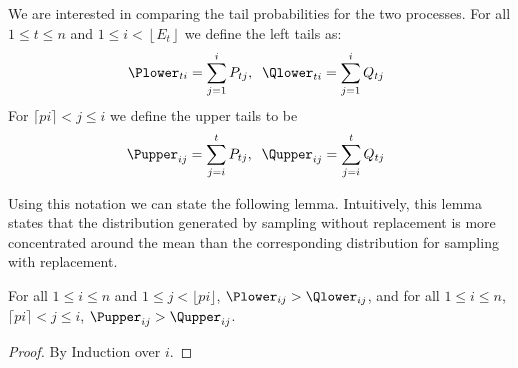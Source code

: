 We are interested in comparing the tail probabilities for the two
processes. For all $1 \leq t \leq n$ and $1 \leq i < \left\lfloor
E_t\right\rfloor $ we define the left tails as:
\[
\Plower_{ti} = \sum_{j=1}^i P_{tj},\;\;
\Qlower_{ti} = \sum_{j=1}^i Q_{tj}\;\;
\]
For $\lceil pi \rceil < j \leq i$ we define the upper tails to be
\[
\Pupper_{ij} = \sum_{j=i}^t P_{tj},\;\;
\Qupper_{ij} = \sum_{j=i}^t Q_{tj}\;\;
\]

Using this notation we can state the following lemma. Intuitively,
this lemma states that the distribution generated by sampling without
replacement is more concentrated around the mean than the
corresponding distribution for sampling with replacement.
\begin{lemma}
For all $1 \leq i \leq n$ and $1 \leq j < \lfloor pi \rfloor$,
$\Plower_{ij} > \Qlower_{ij}$, and for all $1 \leq i \leq n$, $\lceil
pi \rceil < j \leq i$, $\Pupper_{ij} > \Qupper_{ij}$.
\end{lemma}
\begin{proof}
  By Induction over $i$.
  \end{proof}
\fi
